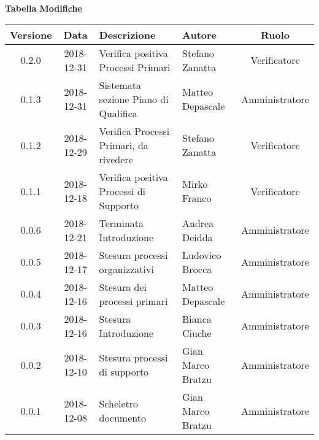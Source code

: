 \begin{center}
	\textbf{Tabella Modifiche}
	\end{center}
	\begin{center}
		\begin{tabularx}{\textwidth}{|c|c|X|X|c|}
			\hline
			\textbf{Versione} & \textbf{Data} & \textbf{Descrizione} & \textbf{Autore} & \textbf{Ruolo} \\
			\hline
			0.2.0 & 2018-12-31 & Verifica positiva Processi Primari & Stefano Zanatta & Verificatore\\
			\hline
			0.1.3 & 2018-12-31 & Sistemata sezione Piano di Qualifica & Matteo Depascale & Amministratore\\
			\hline
			0.1.2 & 2018-12-29 & Verifica Processi Primari, da rivedere & Stefano Zanatta & Verificatore\\
			\hline
			0.1.1 & 2018-12-18 & Verifica positiva Processi di Supporto & Mirko Franco & Verificatore\\
			\hline
			0.0.6 & 2018-12-21 & Terminata Introduzione & Andrea Deidda & Amministratore\\
			\hline
			0.0.5 & 2018-12-17 & Stesura processi organizzativi & Ludovico Brocca & Amministratore\\
			\hline
			0.0.4 & 2018-12-16 & Stesura dei processi primari & Matteo Depascale & Amministratore\\
			\hline
			0.0.3 & 2018-12-16 & Stesura Introduzione & Bianca Ciuche & Amministratore\\
			\hline
			0.0.2 & 2018-12-10 & Stesura processi di supporto & Gian Marco Bratzu & Amministratore\\	
			\hline
			0.0.1 & 2018-12-08 & Scheletro documento  & Gian Marco Bratzu & Amministratore\\
			\hline
		\end{tabularx}
	\end{center}

\newpage